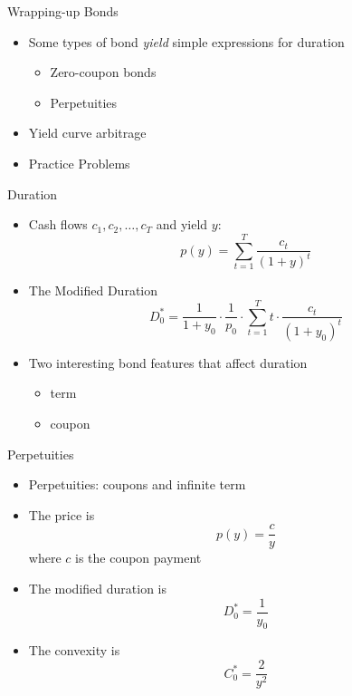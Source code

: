 \documentclass{beamer}
\begin{document}
\begin{frame}{Wrapping-up Bonds}
    \begin{itemize}
        \item Some types of bond \textit{yield} simple expressions for duration 
            \begin{itemize}
                \item Zero-coupon bonds
                \item Perpetuities
            \end{itemize}
        \item Yield curve arbitrage 
        \item Practice Problems
    \end{itemize}
\end{frame}

\begin{frame}{Duration}
\begin{itemize}
\item Cash flows $c_{1},c_{2},\ldots,c_{T}$ and yield $y$:
\begin{equation}
p(y)=\sum_{t=1}^{T}{\frac{c_{t}}{(1+y)^{t}}}
\end{equation}
\item The Modified Duration
    \begin{equation}
        D_{0}^{*}=\frac{1}{1+y_{0}}\cdot\frac{1}{p_{0}}\cdot\sum_{t=1}^{T}{t\cdot\frac{c_{t}}{(1+y_{0})^{t}}}
    \end{equation}
\item Two interesting bond features that affect duration
    \begin{itemize}
        \item term
        \item coupon
    \end{itemize}
\end{itemize}
\end{frame}

\begin{frame}{Perpetuities}
    \begin{itemize}
        \item Perpetuities: coupons and infinite term
        \item The price is
            \begin{equation}
                p(y)=\frac{c}{y}
            \end{equation}
            where $c$ is the coupon payment
        \item The modified duration is 
            \begin{equation}
                D_{0}^{*}=\frac{1}{y_{0}}
            \end{equation}
        \item The convexity is
            \begin{equation}
                C_{0}^{*}=\frac{2}{y^{2}}
            \end{equation}
    \end{itemize}
\end{frame}
\end{document}
